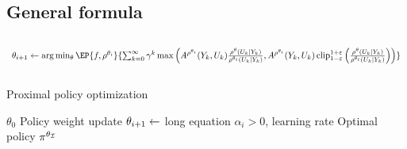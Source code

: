 \documentclass[12pt,twoside]{../../mitthesis}
\begin{document}
\subsection*{General formula}
$$
\begin{array}{l}
    \hphantom{~}
    \\
    \theta_{i+1} \la \arg\min_{\theta}\EP{f, \rho^{\theta_i}}{\sum_{k=0}^{\infty} \gamma ^ k \max\left(A^{\rho^{\theta_i}}(Y_k, U_k)   \frac{\rho^{\theta}(U_k \mid Y_k)}{\rho^{\theta_i}(U_k \mid Y_k)}, A^{\rho^{\theta_i}}(Y_k, U_k) \operatorname{clip}_{1 - \varepsilon}^{1 + \varepsilon}\left(\frac{\rho^{\theta}(U_k \mid Y_k)}{\rho^{\theta_i}(U_k \mid Y_k)}\right) \right)}
    \\
    \hphantom{~}
\end{array}
$$


\begin{algorithm}
    \caption{Proximal policy optimization}
    \label{alg:my-alg}
    \begin{algorithmic}
     $\theta_0$
        \STATE Policy weight update
        \STATE $\theta_{i+1} \leftarrow $ long equation
        \STATE $\alpha_i > 0$, learning rate
    \ENDFOR
    \STATE \RETURN Optimal policy $\pi^{\theta_{\mathcal I}}$
    \end{algorithmic}
\end{algorithm}

\printbibliography
\end{document}
